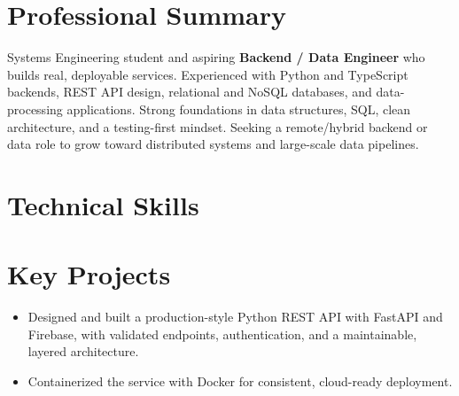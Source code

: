 \documentclass[10pt]{article}
\begin{document}

\section{Professional Summary}
Systems Engineering student and aspiring \textbf{Backend / Data Engineer} who builds real,
deployable services. Experienced with Python and TypeScript backends, REST API design,
relational and NoSQL databases, and data-processing applications. Strong foundations in data
structures, SQL, clean architecture, and a testing-first mindset. Seeking a remote/hybrid
backend or data role to grow toward distributed systems and large-scale data pipelines.

\section{Technical Skills}

\section{Key Projects}

\begin{itemize}
  \item Designed and built a production-style Python REST API with FastAPI and Firebase, with validated endpoints, authentication, and a maintainable, layered architecture.
  \item Containerized the service with Docker for consistent, cloud-ready deployment.
\end{itemize}
\end{document}
